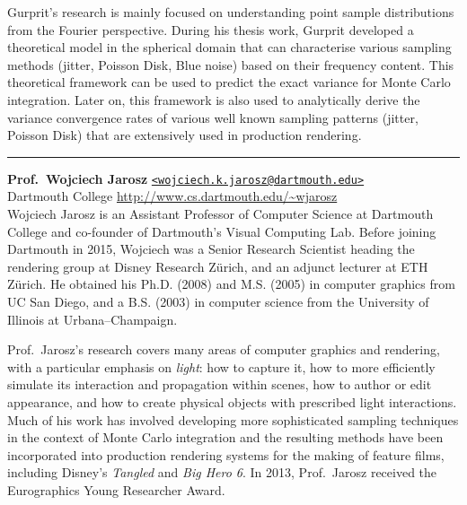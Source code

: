 \documentclass[11pt,fleqn]{book} %
\begin{document}
Gurprit's research is mainly focused on understanding point sample distributions from the Fourier perspective. During his thesis work, Gurprit developed a theoretical model in the spherical domain that can characterise various sampling methods (jitter, Poisson Disk, Blue noise) based on their frequency content. This theoretical framework can be used to predict the exact variance for Monte Carlo integration. Later on, this framework is also used to analytically derive the variance convergence rates 
of various well known sampling patterns (jitter, Poisson Disk) that are extensively used in production rendering.

\medskip
\textcolor[RGB]{220,220,220}{\rule{.9\columnwidth}{0.5pt}}
\medskip

\noindent\textbf{Prof.\ Wojciech Jarosz} \hfill
\href{mailto:wojciech.k.jarosz@dartmouth.edu}{\texttt{<wojciech.k.jarosz@dartmouth.edu>}} \\
Dartmouth College\hfill
\url{http://www.cs.dartmouth.edu/~wjarosz}\\

Wojciech Jarosz is an Assistant Professor of Computer Science at Dartmouth College and co-founder of Dartmouth's Visual Computing Lab. Before joining Dartmouth in 2015, Wojciech was a Senior Research Scientist heading the rendering group at Disney Research Zürich, and an adjunct lecturer at ETH Zürich. He obtained his Ph.D. (2008) and M.S. (2005) in computer graphics from UC San Diego, and a B.S. (2003) in computer science from the University of Illinois at Urbana–Champaign.

Prof.\ Jarosz’s research covers many areas of computer graphics and rendering, with a particular emphasis on \emph{light}: how to capture it, how to more efficiently simulate its interaction and propagation within scenes, how to author or edit appearance, and how to create physical objects with prescribed light interactions. Much of his work has involved developing more sophisticated sampling techniques in the context of Monte Carlo integration and the resulting methods have been incorporated into production rendering systems for the making of feature films, including Disney's \textit{Tangled} and \textit{Big Hero 6}. In 2013, Prof.\ Jarosz received the Eurographics Young Researcher Award.





\end{document}
